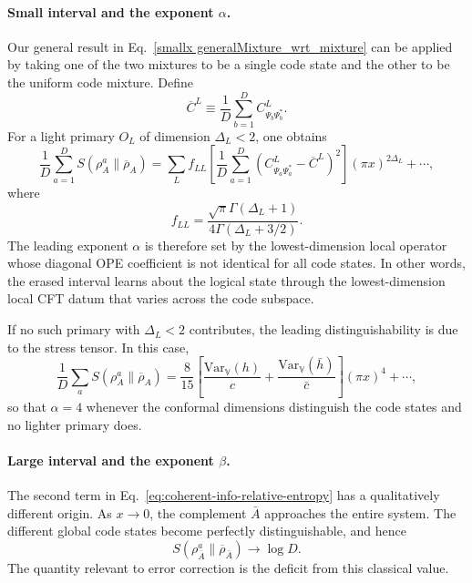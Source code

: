\documentclass[11pt]{article}
\begin{document}
\paragraph{Small interval and the exponent $\alpha$.}
Our general result in Eq.~\eqref{smallx generalMixture_wrt_mixture} can be applied by taking one of the two mixtures to be a single code state and the other to be the uniform code mixture.  Define
\begin{equation}
    \overline C^L
    \equiv \frac1D\sum_{b=1}^{D}
    C^L_{\Psi_b\Psi_b^*}.
\end{equation}
For a light primary $O_L$ of dimension $\Delta_L<2$, one obtains
\begin{equation}
\label{eq:qec-alpha-light}
 \frac1D\sum_{a=1}^{D}
 S(\rho^a_A\|\overline\rho_A)
 =
 \sum_L f_{LL}
 \left[
 \frac1D\sum_{a=1}^{D}
 \left(C^L_{\Psi_a\Psi_a^*}-\overline C^L\right)^2
 \right](\pi x)^{2\Delta_L}
 +\cdots ,
\end{equation}
where
\begin{equation}
    f_{LL}
    =
    \frac{\sqrt{\pi}\Gamma(\Delta_L+1)}
    {4\Gamma(\Delta_L+3/2)}.
\end{equation}
The leading exponent $\alpha$ is therefore set by the lowest-dimension local operator whose diagonal OPE coefficient is not identical for all code states.  In other words, the erased interval learns about the logical
state through the lowest-dimension local CFT datum that varies across the code subspace.

If no such primary with $\Delta_L<2$ contributes, the leading
distinguishability is due to the stress tensor.  In this case,
\begin{equation}
\label{eq:qec-alpha-stress}
 \frac1D\sum_a S(\rho^a_A\|\overline\rho_A)
 =
 \frac{8}{15}
 \left[
 \frac{\mathrm{Var}_{\mathbb{V}}(h)}{c}
 +
 \frac{\mathrm{Var}_{\mathbb{V}}(\bar h)}{\bar c}
 \right](\pi x)^4+\cdots ,
\end{equation}
so that $\alpha=4$ whenever the conformal dimensions distinguish the
code states and no lighter primary does.

\paragraph{Large interval and the exponent $\beta$.}
The second term in Eq.~\eqref{eq:coherent-info-relative-entropy}
has a qualitatively different origin.  As $x\rightarrow0$, the
complement $\bar A$ approaches the entire system.  The different
global code states become perfectly distinguishable, and hence
\begin{equation}
 S(\rho^a_{\bar A}\|\overline\rho_{\bar A})
 \longrightarrow \log D .
\end{equation}
The quantity relevant to error correction is the deficit from this
classical value.
\end{document}

